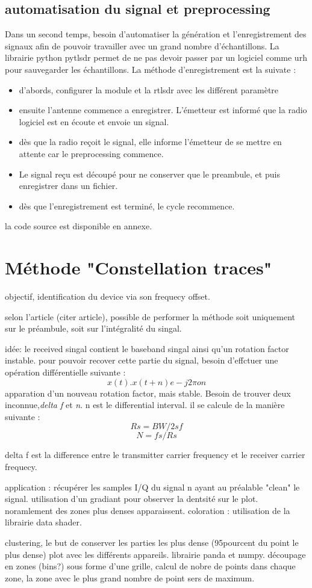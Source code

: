 \subsection{automatisation du signal et preprocessing}

Dans un second temps, besoin d'automatiser la génération et l'enregistrement des signaux afin de pouvoir travailler avec un grand nombre d'échantillons. La librairie python pytlsdr permet de ne pas devoir passer par un logiciel comme urh pour sauvegarder les échantillons. La méthode d'enregistrement est la suivate :

\begin{itemize}
\item d'abords, configurer la module et la rtlsdr avec les différent paramètre
\item ensuite l'antenne commence a enregistrer. L'émetteur est informé que la radio logiciel est en écoute et envoie un signal. 
\item dès que la radio reçoit le signal, elle informe l'émetteur de se mettre en attente car le preprocessing commence.
\item Le signal reçu est découpé pour ne conserver que le preambule, et puis enregistrer dans un fichier.
\item dès que l'enregistrement est terminé, le cycle recommence.
\end{itemize}

la code source est disponible en annexe.


\section{Méthode "Constellation traces"}

objectif, identification du device via son frequecy offset.

selon l'article (citer article), possible de performer la méthode soit uniquement sur le  préambule, soit sur l'intégralité du singal. 

idée: le received singal contient le baseband singal ainsi qu'un rotation factor instable. pour pouvoir recover cette partie du signal, besoin d'effctuer une opération différentielle suivante : $$ x(t) . x(t+n) e -j2\pi on $$
apparation d'un nouveau rotation factor, mais stable. Besoin de trouver deux inconnue,\textit{delta f} et \textit{n}. n est le differential interval. il se calcule de la manière suivante : $$ Rs = BW / 2sf $$ 
$$ N = fs / Rs $$

delta f est la difference entre le transmitter carrier frequency et le receiver carrier frequecy.

application : récupérer les samples I/Q du signal n ayant au préalable "clean" le signal. utilisation d'un gradiant pour observer la dentsité sur le plot. noramlement des zones plus denses apparaissent.
coloration : utilisation de la librairie data shader. 


clustering, le but de conserver les parties les plus dense (95pourcent du point le plus dense) plot avec les différents appareils.
librairie panda et numpy. découpage en zones (bins?) sous forme d'une grille, calcul de nobre de points dans chaque zone, la zone avec le plus grand nombre de point sers de maximum. 
